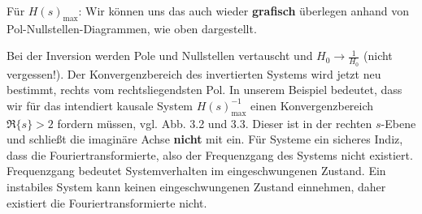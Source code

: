 
\begin{ExCalc}
Für $H(s)_\mathrm{max}$: Wir können uns das auch wieder \textbf{grafisch}
überlegen anhand von Pol-Nullstellen-Diagrammen, wie oben dargestellt.

Bei der Inversion werden Pole und Nullstellen vertauscht und $H_0\rightarrow \frac{1}{H_0}$
(nicht vergessen!).
Der Konvergenzbereich des invertierten Systems wird jetzt neu bestimmt, rechts
vom rechtsliegendsten Pol.
In unserem Beispiel bedeutet, dass wir für das intendiert kausale
System $H(s)_\mathrm{max}^{-1}$ einen Konvergenzbereich $\Re\{s\}>2$ fordern
müssen, vgl. Abb. 3.2 und 3.3. Dieser ist in der rechten $s$-Ebene und schließt die imaginäre Achse
\textbf{nicht} mit ein. Für Systeme ein sicheres Indiz, dass die
Fouriertransformierte, also der Frequenzgang des Systems nicht existiert.
Frequenzgang bedeutet Systemverhalten im eingeschwungenen Zustand. Ein instabiles
System kann keinen eingeschwungenen Zustand einnehmen, daher existiert die
Fouriertransformierte nicht.


\end{ExCalc}



